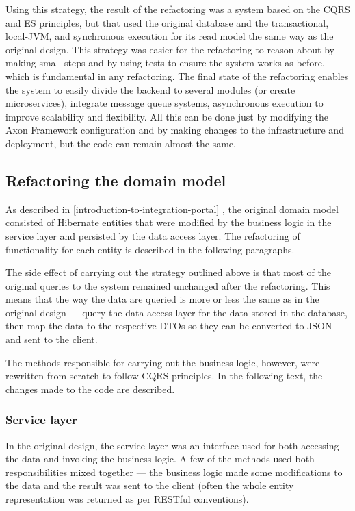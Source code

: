 \documentclass{book}
\begin{document}
Using this strategy, the result of the refactoring was a system based on
the CQRS and ES principles, but that used the original database and the
transactional, local-JVM, and synchronous execution for its read model
the same way as the original design. This strategy was easier for the
refactoring to reason about by making small steps and by using tests to
ensure the system works as before, which is fundamental in any
refactoring. The final state of the refactoring enables the system to
easily divide the backend to several modules (or create microservices),
integrate message queue systems, asynchronous execution to improve
scalability and flexibility. All this can be done just by modifying the
Axon Framework configuration and by making changes to the infrastructure
and deployment, but the code can remain almost the same.


\subsection{Refactoring the domain
model}\label{refactoring-the-domain-model}

As described in \ref{introduction-to-integration-portal}
, the original domain model
consisted of Hibernate entities that were modified by the business logic
in the service layer and persisted by the data access layer. The
refactoring of functionality for each entity is described in the
following paragraphs.

The side effect of carrying out the strategy outlined above is that most
of the original queries to the system remained unchanged after the
refactoring. This means that the way the data are queried is more or
less the same as in the original design --- query the data access layer
for the data stored in the database, then map the data to the respective
DTOs so they can be converted to JSON and sent to the client.

The methods responsible for carrying out the business logic, however,
were rewritten from scratch to follow CQRS principles. In the following
text, the changes made to the code are described.

\subsubsection{Service layer}\label{service-layer}

In the original design, the service layer was an interface used for both
accessing the data and invoking the business logic. A few of the methods
used both responsibilities mixed together --- the business logic made
some modifications to the data and the result was sent to the client
(often the whole entity representation was returned as per RESTful
conventions).
\end{document}

